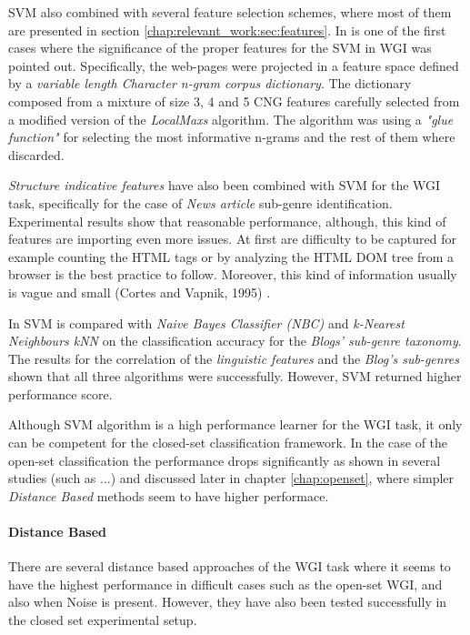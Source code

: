 SVM also combined with several feature selection schemes, where most of them are presented in section \ref{chap:relevant_work:sec:features}. In \parencite{kanaris2009learning} is one of the first cases where the significance of the proper features for the SVM in WGI was pointed out. Specifically, the web-pages were projected in a feature space defined by a \textit{variable length Character n-gram corpus dictionary}. The dictionary composed from a mixture of size 3, 4 and 5 CNG features carefully selected from a modified version of the \textit{LocalMaxs }algorithm. The algorithm was using a \textit{"glue function"} for selecting the most informative n-grams and the rest of them where discarded.

\textit{Structure indicative features} have also been combined with SVM for the WGI task, specifically for the case of \textit{News article} sub-genre identification. Experimental results show that reasonable performance, although, this kind of features are importing even more issues. At first are difficulty to be captured for example counting the HTML tags or by analyzing the HTML DOM tree from a browser is the best practice to follow. Moreover, this kind of information usually is vague and small (Cortes and Vapnik, 1995) .

In \parencite{virik2017blog} SVM is compared with \textit{Naive Bayes Classifier (NBC)} and \textit{k-Nearest Neighbours kNN} on the classification accuracy for the \textit{Blogs' sub-genre taxonomy}. The results for the correlation of the \textit{linguistic features} and the \textit{Blog's sub-genres} shown that all three algorithms were successfully. However, SVM returned higher performance score. 

Although SVM algorithm is a high performance learner for the WGI task, it only can be competent for the closed-set classification framework. In the case of the open-set classification the performance drops significantly as shown in several studies (such as ...) and discussed later in chapter \ref{chap:openset}, where simpler \textit{Distance Based} methods seem to have higher performace.

\paragraph{Distance Based} There are several distance based approaches of the WGI task where it seems to have the highest performance in difficult cases such as the open-set WGI, and also when Noise is present. However, they have also been tested successfully in the closed set experimental setup.


